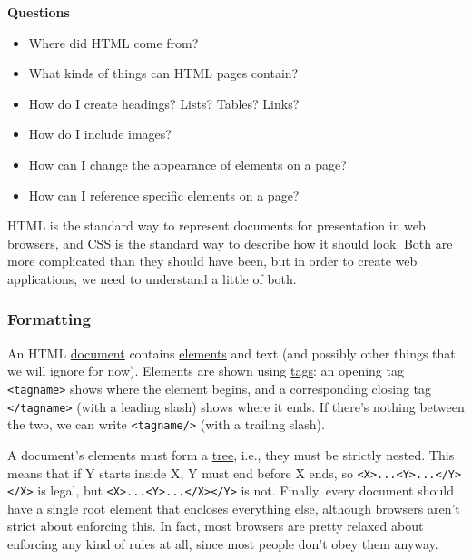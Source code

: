 \textbf{Questions}

\begin{itemize}
\tightlist
\item
  Where did HTML come from?
\item
  What kinds of things can HTML pages contain?
\item
  How do I create headings? Lists? Tables? Links?
\item
  How do I include images?
\item
  How can I change the appearance of elements on a page?
\item
  How can I reference specific elements on a page?
\end{itemize}

HTML is the standard way to represent documents for presentation in web
browsers, and CSS is the standard way to describe how it should look.
Both are more complicated than they should have been, but in order to
create web applications, we need to understand a little of both.

\subsubsection{Formatting}\label{s:htmlcss-formatting}

An HTML \protect\hyperlink{g:document}{document} contains
\protect\hyperlink{g:element}{elements} and text (and possibly other
things that we will ignore for now). Elements are shown using
\protect\hyperlink{g:tag}{tags}: an opening tag
\texttt{\textless{}tagname\textgreater{}} shows where the element
begins, and a corresponding closing tag
\texttt{\textless{}/tagname\textgreater{}} (with a leading slash) shows
where it ends. If there's nothing between the two, we can write
\texttt{\textless{}tagname/\textgreater{}} (with a trailing slash).

A document's elements must form a \protect\hyperlink{g:tree}{tree},
i.e., they must be strictly nested. This means that if Y starts inside
X, Y must end before X ends, so
\texttt{\textless{}X\textgreater{}...\textless{}Y\textgreater{}...\textless{}/Y\textgreater{}\textless{}/X\textgreater{}}
is legal, but
\texttt{\textless{}X\textgreater{}...\textless{}Y\textgreater{}...\textless{}/X\textgreater{}\textless{}/Y\textgreater{}}
is not. Finally, every document should have a single
\protect\hyperlink{g:root-element}{root element} that encloses
everything else, although browsers aren't strict about enforcing this.
In fact, most browsers are pretty relaxed about enforcing any kind of
rules at all, since most people don't obey them anyway.

